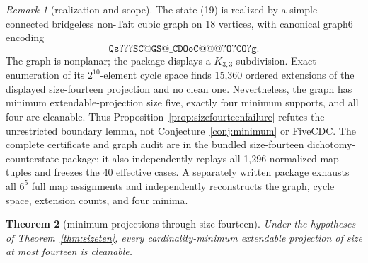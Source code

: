 \documentclass[11pt]{article}
\newtheorem{theorem}{Theorem}[section]
\theoremstyle{definition}
\theoremstyle{remark}
\newtheorem{remark}[theorem]{Remark}
\begin{document}
\begin{remark}[realization and scope]
The state (19) is realized by a simple connected bridgeless non-Tait
cubic graph on 18 vertices, with canonical graph6 encoding
\[
                  \texttt{Qs???SC@GS@\_CDOoC@@@?O?CO?g}.
\]
The graph is nonplanar; the package displays a \(K_{3,3}\) subdivision.
Exact enumeration of its \(2^{10}\)-element cycle space finds 15,360
ordered extensions of the displayed size-fourteen projection and no
clean one.  Nevertheless, the graph has minimum extendable-projection
size five, exactly four minimum supports, and all four are cleanable.
Thus Proposition~\ref{prop:sizefourteenfailure} refutes the unrestricted
boundary lemma, not Conjecture~\ref{conj:minimum} or FiveCDC.  The
complete certificate and graph audit are in the bundled size-fourteen
dichotomy-counterstate package; it also independently replays all 1,296
normalized map tuples and freezes the 40 effective cases.  A separately
written package exhausts all \(6^5\) full map assignments and independently
reconstructs the graph, cycle space, extension counts, and four minima.
\end{remark}

\begin{theorem}[minimum projections through size fourteen]
\label{thm:sizefourteen}
Under the hypotheses of Theorem~\ref{thm:sizeten}, every
cardinality-minimum extendable projection of size at most fourteen is
cleanable.
\end{theorem}
\end{document}
